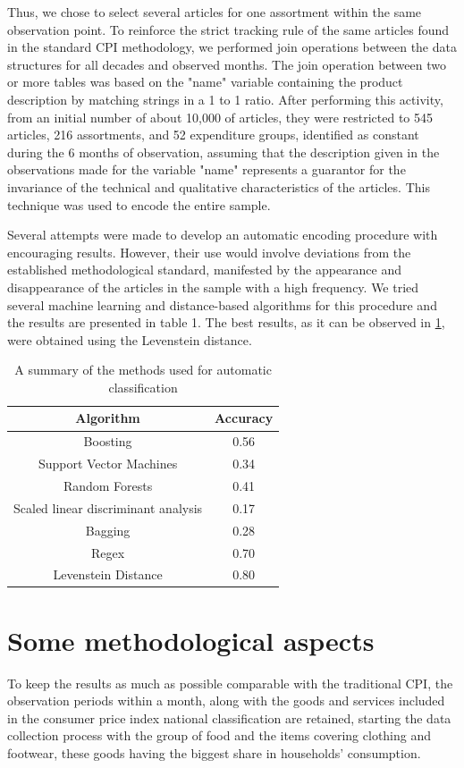 \documentclass[]{article}
\begin{document}
Thus, we chose to select several articles for one assortment within the same observation point. To reinforce the strict tracking 
rule of the same articles found in the standard CPI methodology, we performed join operations between the data structures 
for all decades and observed months. The join operation between two or more tables was based on the "name" variable containing 
the product description by matching strings in a 1 to 1 ratio. After performing this activity, from an initial number 
of about 10,000 of articles, they were restricted to 545 articles, 216 assortments, and 52 expenditure groups, 
identified as constant during the 6 months of observation, assuming that the description given in the observations 
made for the variable "name" represents a guarantor for the invariance of the technical and qualitative characteristics 
of the articles. This technique was used to encode the entire sample.


Several attempts were made to develop an automatic encoding procedure with encouraging results. However, their use 
would involve deviations from the established methodological standard, manifested by the appearance and disappearance 
of the articles in the sample with a high frequency. We tried several machine learning and distance-based algorithms 
for this procedure and the results are presented in table 1. The best results, as it can be observed in \ref{table:1}, 
were obtained using the Levenstein distance.


\begin{table}[h!]
	\centering
	\begin{tabular}{| c| c| }
		\hline
		Algorithm & Accuracy \\
		\hline  
		Boosting & 0.56 \\  
		Support Vector Machines & 0.34 \\
		Random Forests &  0.41 \\
		Scaled linear discriminant analysis & 0.17 \\
		Bagging & 0.28 \\
		Regex & 0.70 \\
		Levenstein Distance & 0.80 \\
		\hline
	\end{tabular}
\caption{A summary of the methods used for automatic classification}
\label{table:1}
\end{table}

\section{Some methodological aspects}
To keep the results as much as possible comparable with the traditional CPI, the observation periods within a month, 
along with the goods and services included in the consumer price index national classification are retained, starting 
the data collection process with the group of food and the items covering clothing and footwear, these goods 
having the biggest share in households’ consumption. 
\end{document}
